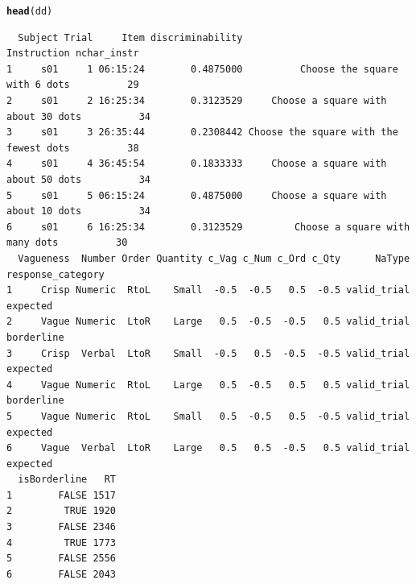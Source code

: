 \documentclass[a4paper,12pt,twoside]{article}\usepackage[]{graphicx}\usepackage[]{color}
\makeatletter
\newcommand{\hlstd}[1]{\textcolor[rgb]{0.345,0.345,0.345}{#1}}%
\newcommand{\hlkwd}[1]{\textcolor[rgb]{0.737,0.353,0.396}{\textbf{#1}}}%
\newenvironment{kframe}{%
 \def\at@end@of@kframe{}%
 \ifinner\ifhmode%
  \def\at@end@of@kframe{\end{minipage}}%
  \begin{minipage}{\columnwidth}%
 \fi\fi%
 \def\FrameCommand##1{\hskip\@totalleftmargin \hskip-\fboxsep
 \colorbox{shadecolor}{##1}\hskip-\fboxsep
     \hskip-\linewidth \hskip-\@totalleftmargin \hskip\columnwidth}%
 \MakeFramed {\advance\hsize-\width
   \@totalleftmargin\z@ \linewidth\hsize
   \@setminipage}}%
 {\par\unskip\endMakeFramed%
 \at@end@of@kframe}
\newenvironment{knitrout}{}{} %
\makeatother
\begin{document}
\clearpage

\begin{knitrout}\scriptsize
{}\color{fgcolor}\begin{kframe}
\begin{alltt}
\hlkwd{head}\hlstd{(dd)}
\end{alltt}
\begin{verbatim}
  Subject Trial     Item discriminability                            Instruction nchar_instr
1     s01     1 06:15:24        0.4875000          Choose the square with 6 dots          29
2     s01     2 16:25:34        0.3123529     Choose a square with about 30 dots          34
3     s01     3 26:35:44        0.2308442 Choose the square with the fewest dots          38
4     s01     4 36:45:54        0.1833333     Choose a square with about 50 dots          34
5     s01     5 06:15:24        0.4875000     Choose a square with about 10 dots          34
6     s01     6 16:25:34        0.3123529         Choose a square with many dots          30
  Vagueness  Number Order Quantity c_Vag c_Num c_Ord c_Qty      NaType response_category
1     Crisp Numeric  RtoL    Small  -0.5  -0.5   0.5  -0.5 valid_trial          expected
2     Vague Numeric  LtoR    Large   0.5  -0.5  -0.5   0.5 valid_trial        borderline
3     Crisp  Verbal  LtoR    Small  -0.5   0.5  -0.5  -0.5 valid_trial          expected
4     Vague Numeric  RtoL    Large   0.5  -0.5   0.5   0.5 valid_trial        borderline
5     Vague Numeric  RtoL    Small   0.5  -0.5   0.5  -0.5 valid_trial          expected
6     Vague  Verbal  LtoR    Large   0.5   0.5  -0.5   0.5 valid_trial          expected
  isBorderline   RT
1        FALSE 1517
2         TRUE 1920
3        FALSE 2346
4         TRUE 1773
5        FALSE 2556
6        FALSE 2043
\end{verbatim}
\end{kframe}
\end{knitrout}

\clearpage
\end{document}
